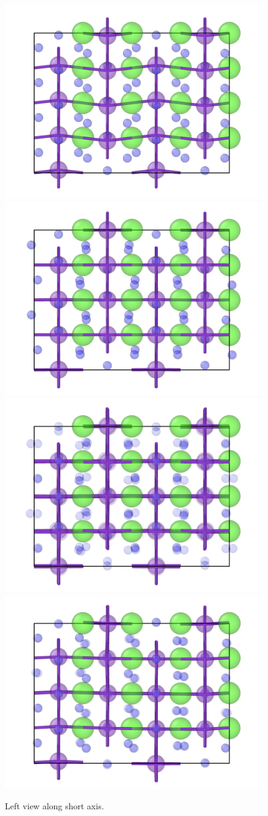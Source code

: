 \documentclass[nobib,a4paper,twoside,notoc,justified,marginals=justified]{tufte-book}
\begin{document}
\begin{figure}
	\includegraphics[width=.5\textwidth]{./plots/defects/062.05.KCaF3/plots/ref_left.png} \hfill
	\includegraphics[width=.5\textwidth]{./plots/defects/062.05.KCaF3/plots/2_left.png} \\
	\includegraphics[width=.5\textwidth]{./plots/defects/062.05.KCaF3/plots/4_left.png} \hfill
	\includegraphics[width=.5\textwidth]{./plots/defects/062.05.KCaF3/plots/5_left.png}
	\caption{Left view along short axis.}
	\label{}
\end{figure}
\end{document}
